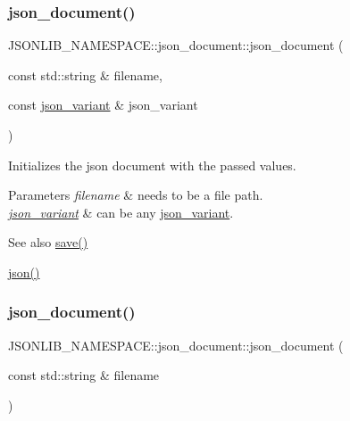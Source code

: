 \subsubsection{\texorpdfstring{json\+\_\+document()}{json\_document()}\hspace{0.1cm}{\footnotesize\ttfamily [1/6]}}
{\footnotesize\ttfamily J\+S\+O\+N\+L\+I\+B\+\_\+\+N\+A\+M\+E\+S\+P\+A\+C\+E\+::json\+\_\+document\+::json\+\_\+document (\begin{DoxyParamCaption}\item[{const std\+::string \&}]{filename,  }\item[{const \hyperlink{classJSONLIB__NAMESPACE_1_1json__variant}{json\+\_\+variant} \&}]{json\+\_\+variant }\end{DoxyParamCaption})}



Initializes the json document with the passed values. 


\begin{DoxyParams}{Parameters}
{\em filename} & needs to be a file path. \\
\hline
{\em \hyperlink{classJSONLIB__NAMESPACE_1_1json__variant}{json\+\_\+variant}} & can be any \hyperlink{classJSONLIB__NAMESPACE_1_1json__variant}{json\+\_\+variant}. \\
\hline
\end{DoxyParams}
\begin{DoxySeeAlso}{See also}
\hyperlink{classJSONLIB__NAMESPACE_1_1json__document_af8f392a0ffc779277ead1f2bdb222930}{save()} 

\hyperlink{classJSONLIB__NAMESPACE_1_1json__document_ad87b8e7d68ba854dbd730758273a3b93}{json()} 
\end{DoxySeeAlso}
\mbox{\label{classJSONLIB__NAMESPACE_1_1json__document_a3295c12f7251f1df5dc5f727a4e5b597}} 
\subsubsection{\texorpdfstring{json\+\_\+document()}{json\_document()}\hspace{0.1cm}{\footnotesize\ttfamily [2/6]}}
{\footnotesize\ttfamily J\+S\+O\+N\+L\+I\+B\+\_\+\+N\+A\+M\+E\+S\+P\+A\+C\+E\+::json\+\_\+document\+::json\+\_\+document (\begin{DoxyParamCaption}\item[{const std\+::string \&}]{filename }\end{DoxyParamCaption})}



